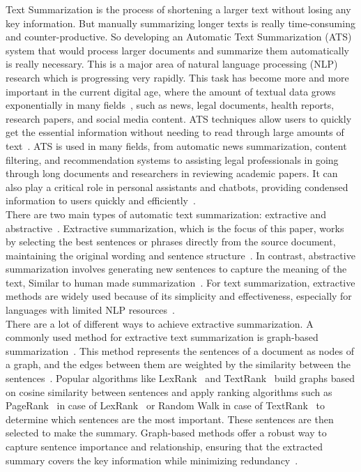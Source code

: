 Text Summarization is the process of shortening a larger text without
losing any key information.
But manually summarizing longer texts is really time-consuming
and counter-productive.
So developing an Automatic Text Summarization (ATS) system
that would process larger documents and summarize them
automatically~\cite{Widyassari-2022-rev-ats-tech-met} is really necessary.
This is a major area of natural language processing (NLP) research
which is progressing very rapidly.
This task has become more and more important in the current digital age,
where the amount of textual data grows exponentially in many
fields~\cite{2015-Forbes-80-created-last-2-years},
such as news, legal documents, health reports, research papers,
and social media content.
ATS techniques allow users to quickly get the essential information
without needing to read through large amounts of
text~\cite{wafaa-2021-summary-comprehensive-review}.
ATS is used in many fields, from automatic
news summarization, content filtering, and recommendation
systems to assisting legal professionals in going through
long documents and researchers in reviewing academic papers.
It can also play a critical role in personal assistants and chatbots,
providing condensed information to users quickly
and efficiently~\cite{tas-2017-rev-text-sum-2}.\\

There are two main types of automatic text summarization: extractive
and abstractive~\cite{tas-2017-rev-text-sum-2}.
Extractive summarization, which is the focus of this paper, works by
selecting the best sentences or phrases directly
from the source document, maintaining the original wording and
sentence structure~\cite{moratanch-2017-extractive-review}.
In contrast, abstractive summarization involves generating new
sentences to capture the meaning of the text, Similar to human made
summarization~\cite{Moratanch-2016-abstractive-rev}.
For text summarization, extractive methods are widely used because of its
simplicity and effectiveness, especially for languages with
limited NLP resources~\cite{gupta-2010-extractive-rev}.\\

There are a lot of different ways to achieve extractive summarization.
A commonly used method for extractive text summarization
is graph-based summarization~\cite{wafaa-2021-summary-comprehensive-review}.
This method represents the sentences of a document as
nodes of a graph, and the edges between them are weighted by the
similarity between the sentences~\cite{wafaa-2021-summary-comprehensive-review}.
Popular algorithms like LexRank~\cite{Erkan-lexRank-2004}
and TextRank~\cite{mihalcea-2004-textrank} build graphs based
on cosine similarity between sentences and
apply ranking algorithms such as PageRank~\cite{page-PageRank-1999} in
case of LexRank~\cite{Erkan-lexRank-2004} or Random
Walk in case of TextRank~\cite{mihalcea-2004-textrank} to
determine which sentences are the most important.
These sentences are then selected to make the summary.
Graph-based methods offer a robust way to capture
sentence importance and relationship, ensuring that the
extracted summary covers the key information while
minimizing redundancy~\cite{wafaa-2021-summary-comprehensive-review}.\\

